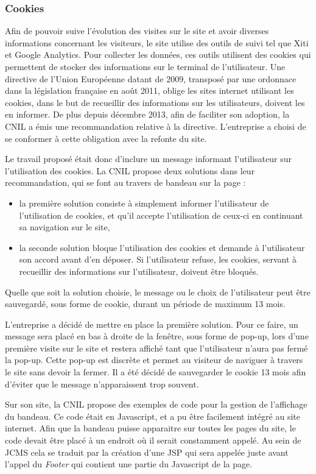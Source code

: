 \documentclass[12pt,a4paper]{article}
\begin{document}
\subsubsection{Cookies}
Afin de pouvoir suive l'évolution des visites sur le site et avoir diverses informations concernant les visiteurs, le site utilise des outils de suivi tel que Xiti et Google Analytics. Pour collecter les données, ces outils utilisent des cookies qui permettent de stocker des informations sur le terminal de l'utilisateur. Une directive de l'Union Européenne datant de 2009, transposé par une ordonnace dans la législation française en août 2011, oblige les sites internet utilisant les cookies, dans le but de recueillir des informations sur les utilisateurs, doivent les en informer. De plus depuis décembre 2013, afin de faciliter son adoption, la CNIL a émis une recommandation relative à la directive. L'entreprise a choisi de se conformer à cette obligation avec la refonte du site.\par 
Le travail proposé était donc d'inclure un message informant l'utilisateur sur l'utilisation des cookies. La CNIL propose deux solutions dans leur recommandation, qui se font au travers de bandeau sur la page :
\begin{itemize}
\item la première solution consiste à simplement informer l'utilisateur de l'utilisation de cookies, et qu'il accepte l'utilisation de ceux-ci en continuant sa navigation sur le site,
\item la seconde solution bloque l'utilisation des cookies et demande à l'utilisateur son accord avant d'en déposer. Si l'utilisateur refuse, les cookies, servant à recueillir des informations sur l'utilisateur, doivent être bloqués.
\end{itemize}\par 
Quelle que soit la solution choisie, le message ou le choix de l'utilisateur peut être sauvegardé, sous forme de cookie, durant un période de maximum 13 mois.\par 
\bigskip
L'entreprise a décidé de mettre en place la première solution. Pour ce faire, un message sera placé en bas à droite de la fenêtre, sous forme de pop-up, lors d'une première visite sur le site et restera affiché tant que l'utilisateur n'aura pas fermé la pop-up. Cette pop-up est discrète et permet au visiteur de naviguer à travers le site sans devoir la fermer. Il a été décidé de sauvegarder le cookie 13 mois afin d'éviter que le message n'apparaissent trop souvent.\par 
Sur son site, la CNIL propose des exemples de code pour la gestion de l'affichage du bandeau. Ce code était en Javascript, et a pu être facilement intégré au site internet. Afin que la bandeau puisse apparaitre sur toutes les pages du site, le code devait être placé à un endroit où il serait constamment appelé. Au sein de \gls{JCMS} cela se traduit par la création d'une JSP qui sera appelée juste avant l'appel du \textit{Footer} qui contient une partie du Javascript de la page.\par
\end{document}
